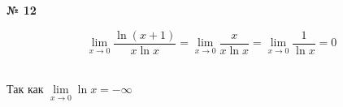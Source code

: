\documentclass{article}
\begin{document}
\textbf{№ 12} 
\large

$$ \lim\limits_{x \to 0} \frac{\ln{(x+1)}}{x\ln{x}}
= \lim\limits_{x \to 0} \frac{x}{x\ln{x}}
= \lim\limits_{x \to 0} \frac{1}{\ln{x}} 
= 0 $$

\\
Так как $ \lim\limits_{x \to 0} \ln{x} = -\infty$
\end{document}
